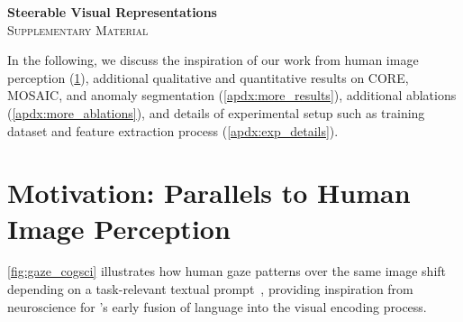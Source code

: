 \newpage
\appendix
\appendix
\setcounter{secnumdepth}{3}   %
\setcounter{tocdepth}{3}      %

\makeatletter
\renewcommand\subsubsection{\@startsection{subsubsection}{3}{\z@}%
  {-1.25ex\@plus -0.5ex \@minus -0.2ex}%
  {0.8ex \@plus 0.2ex}%
  {\normalfont\normalsize\bfseries}}
\makeatother

\begin{center}
\textbf{\Large{Steerable Visual Representations}} \\
\textsc{Supplementary Material}
\end{center}


In the following, we discuss the inspiration of our work from human image perception (\cref{apdx:motivation}),
additional qualitative and quantitative results on CORE, MOSAIC, and anomaly segmentation (\cref{apdx:more_results}),
additional ablations (\cref{apdx:more_ablations}), and
details of experimental setup such as training dataset and feature extraction process (\cref{apdx:exp_details}).




\section{Motivation: Parallels to Human Image Perception}
\label{apdx:motivation}

\cref{fig:gaze_cogsci} illustrates how human gaze patterns over the same image shift depending on a task-relevant textual prompt~\cite{buswell1935people}, providing inspiration from neuroscience for \model{}'s early fusion of language into the visual encoding process.


